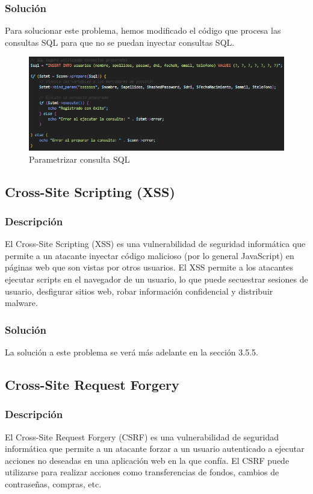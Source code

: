 \documentclass{report}
\begin{document}
                \subsubsection{Solución}
                    Para solucionar este problema, hemos modificado el código que procesa las consultas SQL para que no se puedan inyectar consultas SQL.
                    \begin{figure}[H]
                        \centering
                        \includegraphics[width=\textwidth]{./img/vulnerabilidades/3.3/1.1.png}
                        \caption{Parametrizar consulta SQL}
                    \end{figure}
            \clearpage
            \subsection{Cross-Site Scripting (XSS)}
                \subsubsection{Descripción}
                    El Cross-Site Scripting (XSS) es una vulnerabilidad de seguridad informática que permite a un atacante inyectar código malicioso (por lo general JavaScript) en páginas web que son vistas por otros usuarios. El XSS permite a los atacantes ejecutar scripts en el navegador de un usuario, lo que puede secuestrar sesiones de usuario, desfigurar sitios web, robar información confidencial y distribuir malware.
                \subsubsection{Solución}
                    La solución a este problema se verá más adelante en la sección 3.5.5.
            \clearpage
            \subsection{Cross-Site Request Forgery}
                \subsubsection{Descripción}
                    El Cross-Site Request Forgery (CSRF) es una vulnerabilidad de seguridad informática que permite a un atacante forzar a un usuario autenticado a ejecutar acciones no deseadas en una aplicación web en la que confía. El CSRF puede utilizarse para realizar acciones como transferencias de fondos, cambios de contraseñas, compras, etc.
\end{document}

